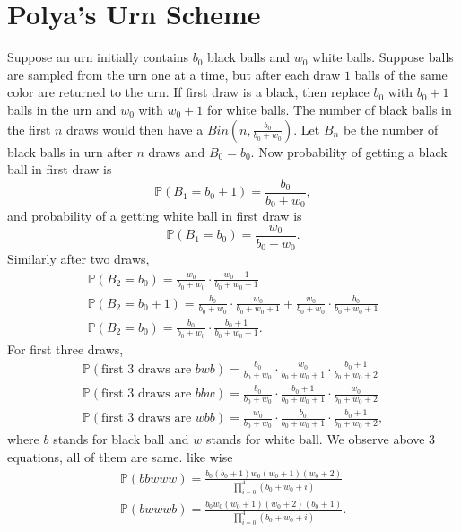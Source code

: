 \documentclass[a4paper,english,10pt]{article}
\begin{document}
\section{Polya's Urn Scheme}
Suppose an urn initially contains $b_0$ black balls and $w_0$ white balls. Suppose balls are sampled from the urn one at a time, but after each draw $1$ balls of the same color are returned to the urn. If first draw is a black, then replace $b_0$ with $b_0+1$ balls in the urn and $w_0$ with $w_0+1$ for white balls. The number of black balls in the first $n$ draws would then have a $Bin(n,\frac{b_0}{b_0+w_0})$.
Let $B_n$ be the number of black balls in urn after $n$ draws and $B_0 = b_0$. Now probability of getting a black ball in first draw is
 \begin{equation*}
\mathbb{P}(B_1=b_0+1)= \frac{b_0}{b_0+w_0},
\end{equation*}
and probability of a getting white ball in first draw is
 \begin{equation*}
\mathbb{P}(B_1=b_0)= \frac{w_0}{b_0+w_0}.
\end{equation*}
Similarly after two draws,
 \begin{align*}
\mathbb{P}(B_2=b_0)= \frac{w_0}{b_0+w_0} \cdot \frac{w_0+1}{b_0+w_0+1}\\
\mathbb{P}(B_2=b_0+1)= \frac{b_0}{b_0+w_0} \cdot \frac{w_0}{b_0+w_0+1}+\frac{w_0}{b_0+w_0} \cdot \frac{b_0}{b_0+w_0+1}\\
\mathbb{P}(B_2=b_0)= \frac{b_0}{b_0+w_0} \cdot \frac{b_0+1}{b_0+w_0+1}.
\end{align*}
For first three draws,
 \begin{align*}
\mathbb{P}(\text{first 3 draws are } bwb)= \frac{b_0}{b_0+w_0} \cdot \frac{w_0}{b_0+w_0+1} \cdot \frac{b_0+1}{b_0+w_0+2}\\
\mathbb{P}(\text{first 3 draws are } bbw)= \frac{b_0}{b_0+w_0} \cdot \frac{b_0+1}{b_0+w_0+1} \cdot \frac{w_0}{b_0+w_0+2}\\
\mathbb{P}(\text{first 3 draws are } wbb)= \frac{w_0}{b_0+w_0} \cdot \frac{b_0}{b_0+w_0+1} \cdot \frac{b_0+1}{b_0+w_0+2},
\end{align*}
where $b$ stands for black ball and $w$ stands for white ball. We observe above 3 equations, all of them are same. like wise
 \begin{align*}
\mathbb{P}(bbwww)= \frac{b_0(b_0+1)w_0(w_0+1)(w_0+2)}{\prod_{i=0}^4 (b_0+w_0+i)}\\
\mathbb{P}(bwwwb)= \frac{b_0w_0(w_0+1)(w_0+2)(b_0+1)}{\prod_{i=0}^4 (b_0+w_0+i)}.
\end{align*}
\end{document}

